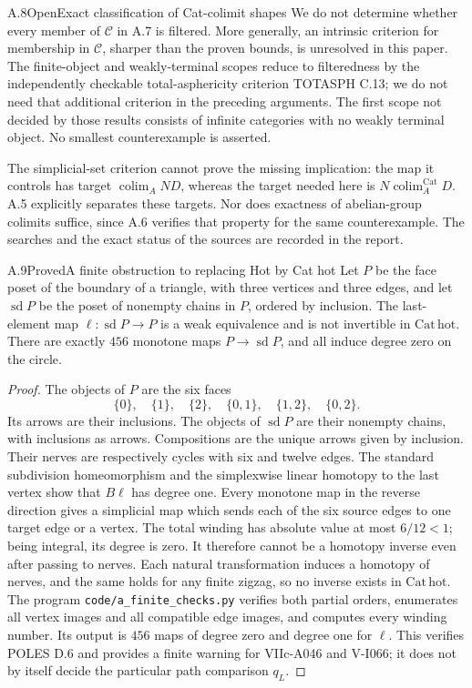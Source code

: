 \begin{result}{A.8}{Open}{Exact classification of Cat-colimit shapes}
We do not determine whether every member of $\mathcal C$ in A.7 is
filtered. More generally, an intrinsic criterion for membership in
$\mathcal C$, sharper than the proven bounds, is unresolved in this
paper. The finite-object and weakly-terminal scopes reduce to
filteredness by the independently checkable total-asphericity
criterion TOTASPH C.13; we do not need that additional criterion in
the preceding arguments. The first scope not decided by those
results consists of infinite categories with no weakly terminal
object. No smallest counterexample is asserted.
\end{result}
The simplicial-set criterion cannot prove the missing implication:
the map it controls has target $\operatorname{colim}_A ND$, whereas
the target needed here is $N\operatorname{colim}^{\mathrm{Cat}}_A D$.
A.5 explicitly separates these targets. Nor does exactness of
abelian-group colimits suffice, since A.6 verifies that property
for the same counterexample. The searches and the exact status of
the sources are recorded in the report.

\begin{result}{A.9}{Proved}{A finite obstruction to replacing Hot by Cat hot}
Let $P$ be the face poset of the boundary of a triangle, with three
vertices and three edges, and let $\operatorname{sd}P$ be the poset
of nonempty chains in $P$, ordered by inclusion. The last-element
map $\ell:\operatorname{sd}P\to P$ is a weak equivalence and is not
invertible in $\mathrm{Cat\,hot}$. There are exactly $456$ monotone
maps $P\to\operatorname{sd}P$, and all induce degree zero on the
circle.
\end{result}
\begin{proof}
The objects of $P$ are the six faces
\[
 \{0\},\quad\{1\},\quad\{2\},\quad
 \{0,1\},\quad\{1,2\},\quad\{0,2\}.
\]
Its arrows are their inclusions. The objects of $\operatorname{sd}P$
are their nonempty chains, with inclusions as arrows. Compositions
are the unique arrows given by inclusion.
Their nerves are respectively cycles with six and twelve edges.
The standard subdivision homeomorphism and the simplexwise linear
homotopy to the last vertex show that $B\ell$ has degree one.
Every monotone map in the reverse direction gives a simplicial map
which sends each of the six source edges to one target edge or a
vertex. The total winding has absolute value at most $6/12<1$;
being integral, its degree is zero. It therefore cannot be a homotopy
inverse even after passing to nerves. Each natural transformation
induces a homotopy of nerves, and the same holds for any finite
zigzag, so no inverse exists in $\mathrm{Cat\,hot}$.
The program \texttt{code/a\_finite\_checks.py} verifies both partial
orders, enumerates all vertex images and all compatible edge images,
and computes every winding number. Its output is $456$ maps of
degree zero and degree one for $\ell$. This verifies POLES D.6 and
provides a finite warning for VIIc-A046 and V-I066; it does not by
itself decide the particular path comparison $q_L$.
\end{proof}
